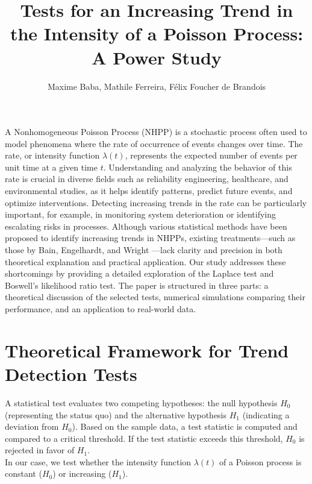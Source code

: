 \documentclass{journalstyle}
\title{Tests for an Increasing Trend in the Intensity of a Poisson Process: A Power Study}
\author{Maxime Baba, Mathile Ferreira, Félix Foucher de Brandois}
\begin{document}
\maketitle





A Nonhomogeneous Poisson Process (NHPP) is a stochastic process often used to model phenomena where the rate of occurrence of events changes over time.
The rate, or intensity function $\lambda(t)$, represents the expected number of events per unit time at a given time $t$.
Understanding and analyzing the behavior of this rate is crucial in diverse fields such as reliability engineering, healthcare, and environmental studies, as it helps identify patterns, predict future events, and optimize interventions.
Detecting increasing trends in the rate can be particularly important, for example, in monitoring system deterioration or identifying escalating risks in processes.
Although various statistical methods have been proposed to identify increasing trends in NHPPs, existing treatments—such as those by Bain, Engelhardt, and Wright \cite{BainEngelhardtWright}—lack clarity and precision in both theoretical explanation and practical application.
Our study addresses these shortcomings by providing a detailed exploration of the Laplace test and Boswell’s likelihood ratio test.
The paper is structured in three parts: a theoretical discussion of the selected tests, numerical simulations comparing their performance, and an application to real-world data.


\section{Theoretical Framework for Trend Detection Tests}

A statistical test evaluates two competing hypotheses: the null hypothesis $H_0$ (representing the status quo) and the alternative hypothesis $H_1$ (indicating a deviation from $H_0$).
Based on the sample data, a test statistic is computed and compared to a critical threshold.
If the test statistic exceeds this threshold, $H_0$ is rejected in favor of $H_1$. \\
In our case, we test whether the intensity function $\lambda(t)$ of a Poisson process is constant ($H_0$) or increasing ($H_1$).
\end{document}
